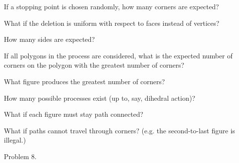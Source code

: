 \documentclass{article}
\begin{document}
\begin{question}
  If a stopping point is chosen randomly, how many corners are expected?
\end{question}
\begin{related}
  \item What if the deletion is uniform with respect to faces instead of
    vertices?
  \item How many sides are expected?
  \item If all polygons in the process are considered, what is the expected
    number of corners on the polygon with the greatest number of corners?
  \item What figure produces the greatest number of corners?
  \item How many possible processes exist (up to, say, dihedral action)?
  \item What if each figure must stay path connected?
  \item What if paths cannot travel through corners? (e.g. the second-to-last
    figure is illegal.)
\end{related}

\begin{references}
  \item Problem 8.
\end{references}
\end{document}
